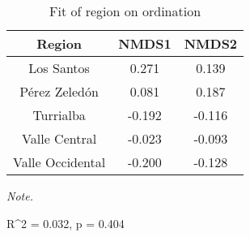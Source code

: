 \begin{table}[!h]
\centering
\caption{\label{tab:nmds_region_fit}Fit of region on ordination}
\centering
\fontsize{9}{11}\selectfont
\begin{threeparttable}
\begin{tabular}[t]{ccc}
\hline\hline
Region & NMDS1 & NMDS2\\
\midrule
Los Santos & 0.271 & 0.139\\
Pérez Zeledón & 0.081 & 0.187\\
Turrialba & -0.192 & -0.116\\
Valle Central & -0.023 & -0.093\\
Valle Occidental & -0.200 & -0.128\\
\hline\hline
\end{tabular}
\begin{tablenotes}[para]
\item \textit{Note. } 
\item R^2 = 0.032, p = 0.404
\end{tablenotes}
\end{threeparttable}
\end{table}
